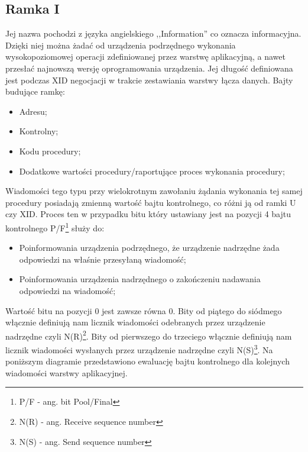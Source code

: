 \subsection{Ramka I}
Jej nazwa pochodzi z języka angielskiego ,,Information'' co oznacza informacyjna. \autocite{WIKI_ENG_HDLC}
Dzięki niej można żadać od urządzenia podrzędnego wykonania wysokopoziomowej operacji zdefiniowanej przez warstwę aplikacyjną, a nawet przesłać 
najnowszą wersję oprogramowania urządzenia. Jej długość definiowana jest podczas XID negocjacji w trakcie zestawiania warstwy łącza danych. 
\newline
Bajty budujące ramkę:
\begin{itemize}
	\item Adresu;
	\item Kontrolny;
	\item Kodu procedury;
	\item Dodatkowe wartości procedury/raportujące proces wykonania procedury;
\end{itemize}
Wiadomości tego typu przy wielokrotnym zawołaniu żądania wykonania tej samej procedury posiadają zmienną wartość bajtu kontrolnego, co różni ją od ramki U czy XID. 
\newline
Proces ten w przypadku bitu który ustawiany jest na pozycji 4 bajtu kontrolnego P/F\footnote{\label{Bit P/F} P/F - ang. bit Pool/Final} służy do:
\begin{itemize}
	\item Poinformowania urządzenia podrzędnego, że urządzenie nadrzędne żada odpowiedzi na właśnie przesyłaną wiadomość;
	\item Poinformowania urządzenia nadrzędnego o zakończeniu nadawania odpowiedzi na wiadomość;
\end{itemize}
Wartość bitu na pozycji 0 jest zawsze równa 0. 
Bity od piątego do siódmego włącznie definiują nam licznik wiadomości odebranych przez urządzenie nadrzędne czyli N(R)\footnote{\label{N(R)} N(R) - ang. Receive sequence number}. 
Bity od pierwszego do trzeciego włącznie definiują nam licznik wiadomości wysłanych przez urządzenie nadrzędne czyli N(S)\footnote{\label{N(S)} N(S) - ang. Send sequence number}.
Na poniższym diagramie przedstawiono ewaluację bajtu kontrolnego dla kolejnych wiadomości warstwy aplikacyjnej.
